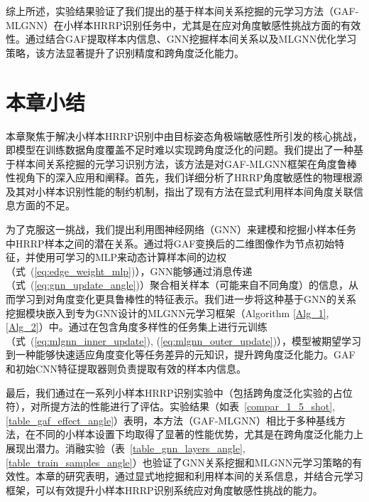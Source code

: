 综上所述，实验结果验证了我们提出的基于样本间关系挖掘的元学习方法（GAF-MLGNN）在小样本HRRP识别任务中，尤其是在应对角度敏感性挑战方面的有效性。通过结合GAF提取样本内信息、GNN挖掘样本间关系以及MLGNN优化学习策略，该方法显著提升了识别精度和跨角度泛化能力。

\section{本章小结}
\label{sec:angle_summary}

本章聚焦于解决小样本HRRP识别中由目标姿态角极端敏感性所引发的核心挑战，即模型在训练数据角度覆盖不足时难以实现跨角度泛化的问题。我们提出了一种基于样本间关系挖掘的元学习识别方法，该方法是对GAF-MLGNN框架在角度鲁棒性视角下的深入应用和阐释。首先，我们详细分析了HRRP角度敏感性的物理根源及其对小样本识别性能的制约机制，指出了现有方法在显式利用样本间角度关联信息方面的不足。

为了克服这一挑战，我们提出利用图神经网络（GNN）来建模和挖掘小样本任务中HRRP样本之间的潜在关系。通过将GAF变换后的二维图像作为节点初始特征，并使用可学习的MLP来动态计算样本间的边权（式~(\ref{eq:edge_weight_mlp})），GNN能够通过消息传递（式~(\ref{eq:gnn_update_angle})）聚合相关样本（可能来自不同角度）的信息，从而学习到对角度变化更具鲁棒性的特征表示。我们进一步将这种基于GNN的关系挖掘模块嵌入到专为GNN设计的MLGNN元学习框架（Algorithm \ref{Alg_1}, \ref{Alg_2}）中。通过在包含角度多样性的任务集上进行元训练（式~(\ref{eq:mlgnn_inner_update}), (\ref{eq:mlgnn_outer_update})），模型被期望学习到一种能够快速适应角度变化等任务差异的元知识，提升跨角度泛化能力。GAF和初始CNN特征提取器则负责提取有效的样本内信息。

最后，我们通过在一系列小样本HRRP识别实验中（包括跨角度泛化实验的占位符），对所提方法的性能进行了评估。实验结果（如表~\ref{compar_1_5_shot}, \ref{table_gaf_effect_angle}）表明，本方法（GAF-MLGNN）相比于多种基线方法，在不同的小样本设置下均取得了显著的性能优势，尤其是在跨角度泛化能力上展现出潜力。消融实验（表~\ref{table_gnn_layers_angle}, \ref{table_train_samples_angle}）也验证了GNN关系挖掘和MLGNN元学习策略的有效性。本章的研究表明，通过显式地挖掘和利用样本间的关系信息，并结合元学习框架，可以有效提升小样本HRRP识别系统应对角度敏感性挑战的能力。
